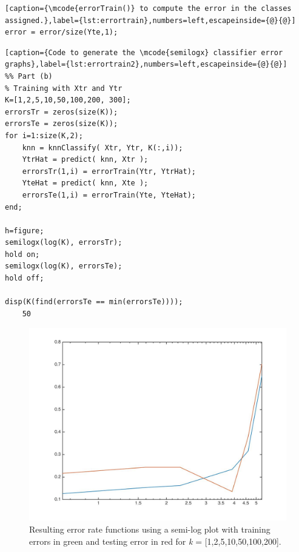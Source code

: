 \documentclass[a4paper, 11pt]{article}
\begin{document}
\begin{enumerate}[(a)]
\begin{lstlisting}[caption={\mcode{errorTrain()} to compute the error in the classes assigned.},label={lst:errortrain},numbers=left,escapeinside={@}{@}]
error = error/size(Yte,1);
\end{lstlisting}
\vspace{-20pt}
\begin{lstlisting}[caption={Code to generate the \mcode{semilogx} classifier error graphs},label={lst:errortrain2},numbers=left,escapeinside={@}{@}]
%% Part (b)
% Training with Xtr and Ytr
K=[1,2,5,10,50,100,200, 300];
errorsTr = zeros(size(K));
errorsTe = zeros(size(K));
for i=1:size(K,2);
    knn = knnClassify( Xtr, Ytr, K(:,i));
    YtrHat = predict( knn, Xtr );
    errorsTr(1,i) = errorTrain(Ytr, YtrHat);
    YteHat = predict( knn, Xte );
    errorsTe(1,i) = errorTrain(Yte, YteHat);
end;

h=figure;
semilogx(log(K), errorsTr);
hold on;
semilogx(log(K), errorsTe);
hold off;

disp(K(find(errorsTe == min(errorsTe))));
    50
\end{lstlisting}
\begin{figure}
\centering
\includegraphics[scale=0.25]{errorrate.jpg}
\caption[Error2]{Resulting error rate functions using a semi-log plot with training errors in green and testing error in red for \textit{k} = [1,2,5,10,50,100,200].}
\label{fig:errorrate}
\end{figure}
\begin{figure}
\centering

\end{figure}
\end{enumerate}
\end{document}
